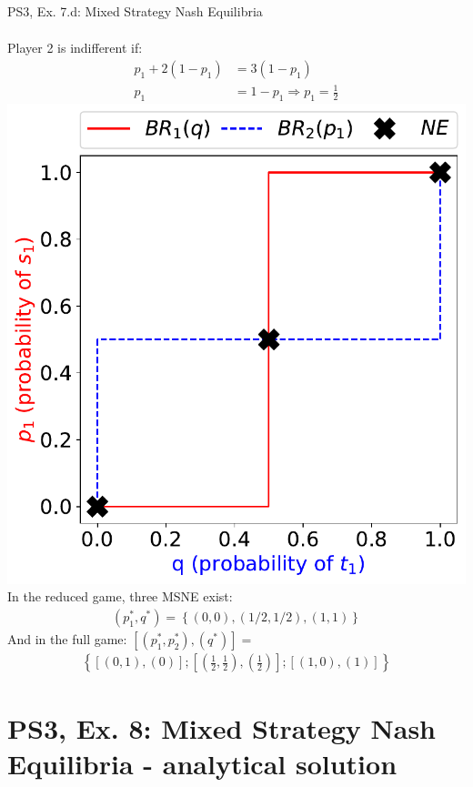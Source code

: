 \begin{frame}{PS3, Ex. 7.d: Mixed Strategy Nash Equilibria}
\begin{multicols}{2}
\begin{align*}
    \end{align*}
    Player 2 is indifferent if:
    \vspace{-4pt}
    \begin{align*}
      p_1 + 2(1-p_1)  &= 3(1-p_1) \\
      p_1             &= 1-p_1 \Rightarrow p_1 = \frac{1}{2}
    \end{align*}
  \vfill\null \columnbreak
    \includegraphics[width=\columnwidth]{figures/5d2}
    In the reduced game, three MSNE exist:
    \begin{align*}
      (p_1^{*},q^{*})=\left\{(0,0),(1/2,1/2),(1,1)\right\}
    \end{align*}
    And in the full game: $\left[(p_1^{*},p_2^{*}),(q^{*})\right]=$
    \begin{align*}
      \left\{\left[(0,1),(0)\right];\left[\left(\frac{1}{2},\frac{1}{2}\right),\left(\frac{1}{2}\right)\right];\left[(1,0),(1)\right]\right\}
    \end{align*}
  \vfill\null
  \end{multicols}
\end{frame}


\section{PS3, Ex. 8: Mixed Strategy Nash Equilibria - analytical solution}

